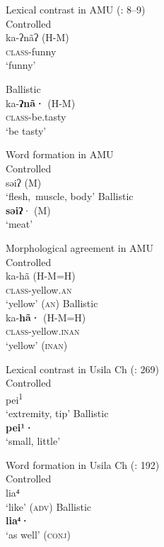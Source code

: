 \documentclass[output=paper]{langscibook}
\begin{document}
\ea\label{ex:dobui:1}
{ Lexical contrast in AMU (\citealt{Bauernschmidt2010}: 8–9)}\\
\ea\label{ex:dobui:1a}
{Controlled}\\
\gll ka-ʔnãʔ (H-M)\\
     \textsc{class}-funny\\
\glt ‘funny’

\ex\label{ex:dobui:1b}
{Ballistic}\\
\gll ka-\textbf{ʔnã·} (H-M)\\
     \textsc{class}-be.tasty\\
\glt ‘be tasty’
\z
\z

\ea\label{ex:dobui:2}
{ Word formation in AMU \citep[314]{Bauernschmidt2010}}\\
\ea\label{ex:dobui:2a}
{Controlled}\\
  səiʔ (M)\\
\glt ‘flesh,~muscle, body’
\ex\label{ex:dobui:2b}
{Ballistic}\\
\textbf{səiʔ}· (M)\\
\glt ‘meat’
\z
\z

\newpage
\ea\label{ex:dobui:3}
{ Morphological agreement in AMU \citep{JP2017}}\\
\ea\label{ex:dobui:3a}
{Controlled}\\
\gll ka-hã  (H-M=H) \\
     \textsc{class}-yellow.\textsc{a}\textsc{n}\\
\glt ‘yellow’ (\textsc{an})
\ex\label{ex:dobui:3b}
{Ballistic}\\
\gll ka-\textbf{hã·} (H-M=H)\\
     \textsc{class}-yellow.\textsc{inan}\\
\glt ‘yellow’ (\textsc{inan})
\z
\z

\ea\label{ex:dobui:4}
{ Lexical contrast in Usila Ch (\citealt{SkinnerSkinner2000}: 269)}\\
\ea\label{ex:dobui:4a}
{ Controlled}\\
  pei\textsuperscript{1}\\
\glt ‘extremity, tip’
\ex\label{ex:dobui:4b}
{ Ballistic}\\
\textbf{pei¹·}\\
\glt ‘small, little’
\z
\z

\ea\label{ex:dobui:5}
{ Word formation in Usila Ch (\citealt{SkinnerSkinner2000}: 192)}\\
\ea\label{ex:dobui:5a}
{Controlled}\\
  lia⁴\\
\glt ‘like’ (\textsc{adv})
\ex\label{ex:dobui:5b}
{Ballistic}\\
\textbf{lia⁴·}\\
\glt ‘as well’ (\textsc{conj})
\z
\z
\end{document}
